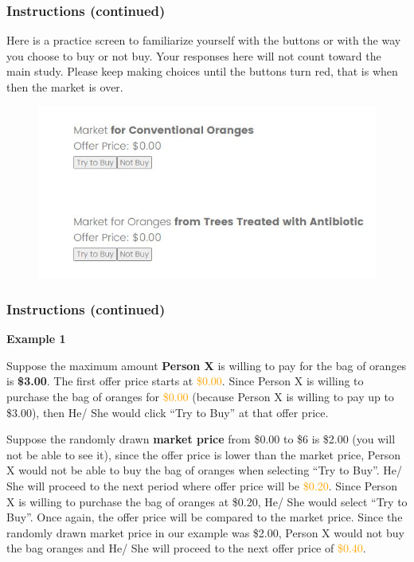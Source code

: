 \documentclass[12pt]{article}
\begin{document}
\subsubsection*{\textbf{Instructions (continued)}}


Here is a practice screen to familiarize yourself with the buttons or with the way you choose to buy or not buy. Your responses here will not count toward the main study.
Please keep making choices until the buttons turn red, that is when then the market is over.

\begin{figure}[H]
    \centering
    \includegraphics[width=0.8\linewidth]{GSO.JPG}
    
    \label{fig:GSO}
\end{figure}

\clearpage


\subsubsection*{\textbf{Instructions (continued)}}

\textbf{Example 1}

Suppose the maximum amount \textbf{Person X} is willing to pay for the bag of oranges is \textbf{\$3.00}. The first offer price starts at \textcolor{orange}{\$0.00}. Since Person X is willing to purchase the bag of oranges for \textcolor{orange}{\$0.00} (because Person X is willing to pay up to \$3.00), then He/ She would click “Try to Buy” at that offer price.

Suppose the randomly drawn \textbf{market price} from \$0.00 to \$6 is \$2.00 (you will not be able to see it), since the offer price is lower than the market price, Person X would not be able to buy the bag of oranges when selecting “Try to Buy”. He/ She will proceed to the next period where offer price will be \textcolor{orange}{\$0.20}.
Since Person X is willing to purchase the bag of oranges at \$0.20, He/ She would select “Try to Buy”. Once again, the offer price will be compared to the market price. Since the randomly drawn market price in our example was \$2.00, Person X would not buy the bag oranges and He/ She will proceed to the next offer price of \textcolor{orange}{\$0.40}.
\end{document}
